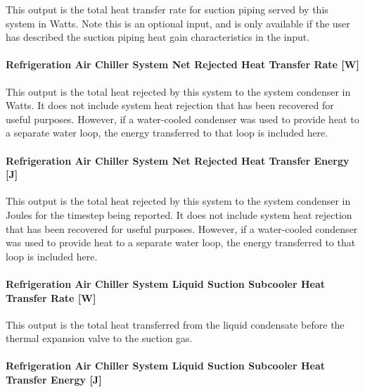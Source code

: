 This output is the total heat transfer rate for suction piping served by this system in Watts. Note this is an optional input, and is only available if the user has described the suction piping heat gain characteristics in the input.

\paragraph{Refrigeration Air Chiller System Net Rejected Heat Transfer Rate {[}W{]}}\label{refrigeration-air-chiller-system-net-rejected-heat-transfer-rate-w}

This output is the total heat rejected by this system to the system condenser in Watts. It does not include system heat rejection that has been recovered for useful purposes. However, if a water-cooled condenser was used to provide heat to a separate water loop, the energy transferred to that loop is included here.

\paragraph{Refrigeration Air Chiller System Net Rejected Heat Transfer Energy {[}J{]}}\label{refrigeration-air-chiller-system-net-rejected-heat-transfer-energy-j}

This output is the total heat rejected by this system to the system condenser in Joules for the timestep being reported. It does not include system heat rejection that has been recovered for useful purposes. However, if a water-cooled condenser was used to provide heat to a separate water loop, the energy transferred to that loop is included here.

\paragraph{Refrigeration Air Chiller System Liquid Suction Subcooler Heat Transfer Rate {[}W{]}}\label{refrigeration-air-chiller-system-liquid-suction-subcooler-heat-transfer-rate-w}

This output is the total heat transferred from the liquid condensate before the thermal expansion valve to the suction gas.

\paragraph{Refrigeration Air Chiller System Liquid Suction Subcooler Heat Transfer Energy {[}J{]}}\label{refrigeration-air-chiller-system-liquid-suction-subcooler-heat-transfer-energy-j}

